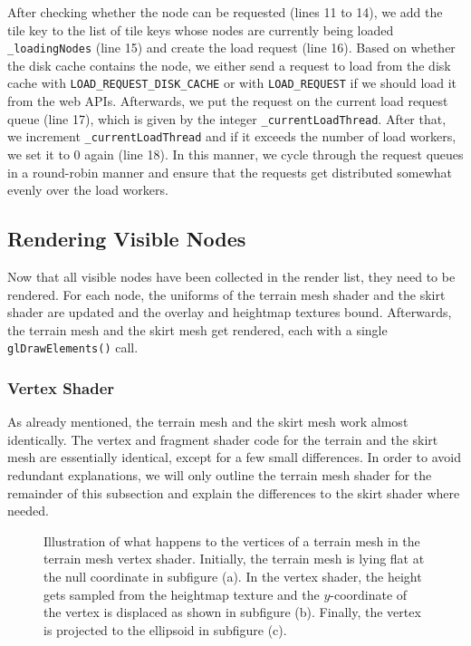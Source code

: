 After checking whether the node can be requested (lines 11 to 14),
we add the tile key to the list of tile keys whose nodes 
are currently being loaded \texttt{\_loadingNodes} (line 15)
and create the load request (line 16). Based on whether 
the disk cache contains the node, we either send a request 
to load from the disk cache with \texttt{LOAD\_REQUEST\_DISK\_CACHE}
or with \texttt{LOAD\_REQUEST} if we should load it from the web APIs.
Afterwards, we put the request on the current load request queue (line 17),
which is given by the integer \texttt{\_currentLoadThread}.
After that, we increment \texttt{\_currentLoadThread} and if 
it exceeds the number of load workers, we set it to 0 again (line 18).
In this manner, we cycle through the request queues in a round-robin 
manner and ensure that the requests get distributed somewhat evenly 
over the load workers.

\subsection{Rendering Visible Nodes}
Now that all visible nodes have been collected 
in the render list, they need to be rendered.
For each node, the uniforms of the terrain mesh shader 
and the skirt shader are updated
and the overlay and heightmap textures bound.
Afterwards, the terrain mesh and the skirt mesh
get rendered, each with a single \texttt{glDrawElements()} call.

\subsubsection{Vertex Shader}
As already mentioned, the terrain mesh and the skirt mesh work 
almost identically. The vertex and fragment shader code 
for the terrain and the skirt mesh
are essentially identical, except for a few small differences.
In order to avoid redundant explanations, we will only 
outline the terrain mesh shader for the remainder of this subsection
and explain the differences to the skirt shader where needed.

\begin{figure}[H]
  \centering
  \qquad
  \qquad
  \caption{Illustration of what happens to the vertices of a terrain mesh in the terrain mesh vertex shader. 
  Initially, the terrain mesh is lying flat at the null coordinate in subfigure (a).
  In the vertex shader, the height gets sampled from the heightmap texture 
  and the $y$-coordinate of the vertex is displaced as shown in subfigure (b).
  Finally, the vertex is projected to the ellipsoid in subfigure (c).}\label{fig:displacement}
\end{figure}

